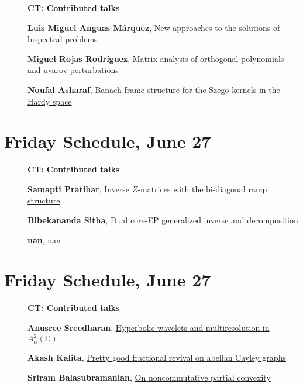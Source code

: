 \documentclass[ILAS2025-program.tex]{subfiles}
\begin{document}
        \begin{description}
    \item[] {\color{mstitle}\textbf{CT: Contributed talks}} 
    \item[] \hypertarget{up0401}{}\textbf{Luis Miguel Anguas Márquez}, \hyperlink{down0401}{New approaches to the solutions of bispectral problems}
        \item[] \hypertarget{up0402}{}\textbf{Miguel Rojas Rodríguez}, \hyperlink{down0402}{Matrix analysis of orthogonal polynomials and uvarov perturbations}
        \item[] \hypertarget{up0403}{}\textbf{Noufal Asharaf}, \hyperlink{down0403}{Banach frame structure for the Szego kernels in the Hardy space}
        \end{description}
    \newpage

\section*{Friday Schedule, June 27 }
        
        \begin{description}
    \item[] {\color{mstitle}\textbf{CT: Contributed talks}} 
    \item[] \hypertarget{up0404}{}\textbf{Samapti Pratihar}, \hyperlink{down0404}{Inverse $Z$-matrices with the bi-diagonal ramp structure}
        \item[] \hypertarget{up0405}{}\textbf{Bibekananda Sitha}, \hyperlink{down0405}{Dual core-EP generalized inverse and decomposition}
        \item[] \hypertarget{up0406}{}\textbf{nan}, \hyperlink{down0406}{nan}
        \end{description}
    \newpage

\section*{Friday Schedule, June 27 }
        
        \begin{description}
    \item[] {\color{mstitle}\textbf{CT: Contributed talks}} 
    \item[] \hypertarget{up0407}{}\textbf{Anusree Sreedharan}, \hyperlink{down0407}{Hyperbolic wavelets and multiresolution in $A_{\alpha}^{2} (\mathbb{D})$}
        \item[] \hypertarget{up0408}{}\textbf{Akash Kalita}, \hyperlink{down0408}{Pretty good fractional revival on abelian Cayley graphs}
        \item[] \hypertarget{up0409}{}\textbf{Sriram Balasubramanian}, \hyperlink{down0409}{On noncommutative partial convexity}
        \end{description}
    \newpage
\end{document}
